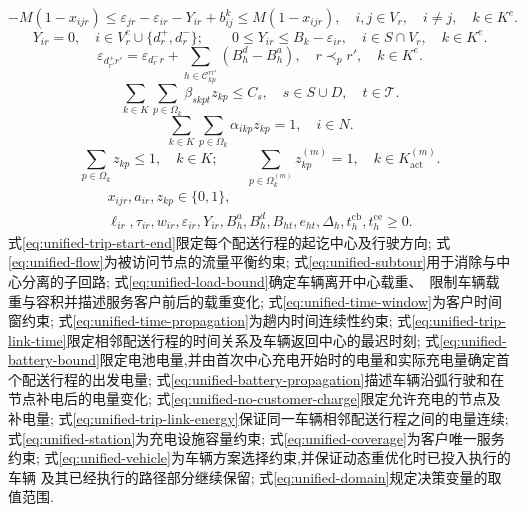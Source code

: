 \documentclass{setp-new}
\begin{document}
\begin{equation}
-M(1-x_{ijr})
\le\varepsilon_{jr}-\varepsilon_{ir}-Y_{ir}+b_{ij}^{k}
\le M(1-x_{ijr}),
\quad i,j\in V_r,\quad i\ne j,\quad k\in K^{e}.
\label{eq:unified-battery-propagation}
\end{equation}
\begin{equation}
Y_{ir}=0,\quad i\in V_r^{c}\cup\{d_r^{+},d_r^{-}\};\qquad
0\le Y_{ir}\le B_k-\varepsilon_{ir},\quad i\in S\cap V_r,\quad k\in K^{e}.
\label{eq:unified-no-customer-charge}
\end{equation}
\begin{equation}
\varepsilon_{d_{r'}^{+}r'}
=\varepsilon_{d_r^{-}r}
+\sum_{h\in\mathcal C_{kp}^{rr'}}(B_h^{d}-B_h^{a}),
\quad r\prec_p r',\quad k\in K^{e}.
\label{eq:unified-trip-link-energy}
\end{equation}
\begin{equation}
\sum_{k\in K}\sum_{p\in\Omega_k}\beta_{skpt}z_{kp}\le C_s,
\quad s\in S\cup D,\quad t\in\mathcal T .
\label{eq:unified-station}
\end{equation}
\begin{equation}
\sum_{k\in K}\sum_{p\in\Omega_k}\alpha_{ikp}z_{kp}=1,
\quad i\in N .
\label{eq:unified-coverage}
\end{equation}
\begin{equation}
\sum_{p\in\Omega_k}z_{kp}\le1,\quad k\in K;\qquad
\sum_{p\in\Omega_k^{(m)}}z_{kp}^{(m)}=1,\quad k\in K_{\mathrm{act}}^{(m)}.
\label{eq:unified-vehicle}
\end{equation}
\begin{equation}
\begin{gathered}
x_{ijr},a_{ir},z_{kp}\in\{0,1\},\\
\ell_{ir},\tau_{ir},w_{ir},\varepsilon_{ir},Y_{ir},
B_h^{a},B_h^{d},B_{ht},e_{ht},\Delta_h,
t_h^{\mathrm{cb}},t_h^{\mathrm{ce}}\ge0 .
\end{gathered}
\label{eq:unified-domain}
\end{equation}
式\eqref{eq:unified-trip-start-end}限定每个配送行程的起讫中心及行驶方向;
式\eqref{eq:unified-flow}为被访问节点的流量平衡约束;
式\eqref{eq:unified-subtour}用于消除与中心分离的子回路;
式\eqref{eq:unified-load-bound}确定车辆离开中心载重、~限制车辆载重与容积并描述服务客户前后的载重变化;
式\eqref{eq:unified-time-window}为客户时间窗约束;
式\eqref{eq:unified-time-propagation}为趟内时间连续性约束;
式\eqref{eq:unified-trip-link-time}限定相邻配送行程的时间关系及车辆返回中心的最迟时刻;
式\eqref{eq:unified-battery-bound}限定电池电量,并由首次中心充电开始时的电量和实际充电量确定首个配送行程的出发电量;
式\eqref{eq:unified-battery-propagation}描述车辆沿弧行驶和在节点补电后的电量变化;
式\eqref{eq:unified-no-customer-charge}限定允许充电的节点及补电量;
式\eqref{eq:unified-trip-link-energy}保证同一车辆相邻配送行程之间的电量连续;
式\eqref{eq:unified-station}为充电设施容量约束;
式\eqref{eq:unified-coverage}为客户唯一服务约束;
式\eqref{eq:unified-vehicle}为车辆方案选择约束,并保证动态重优化时已投入执行的车辆
及其已经执行的路径部分继续保留;
式\eqref{eq:unified-domain}规定决策变量的取值范围.
\endgroup
\end{document}
